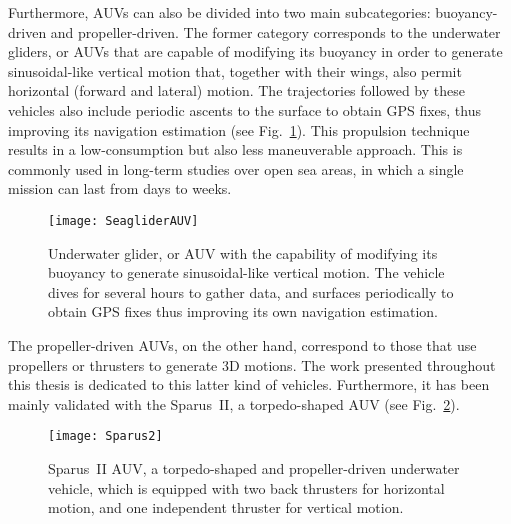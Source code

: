 Furthermore, \acp{AUV} can also be divided into two main subcategories:
buoyancy-driven and propeller-driven. The former category corresponds to the
underwater gliders, or \acp{AUV} that are capable of modifying its buoyancy in
order to generate sinusoidal-like vertical motion that, together with their
wings, also permit horizontal (forward and lateral) motion. The trajectories
followed by these vehicles also include periodic ascents to the surface to
obtain GPS fixes, thus improving its navigation estimation (see
Fig.~\ref{fig:GliderAUV}). This propulsion technique results in a
low-consumption but also less maneuverable approach. This is commonly used in
long-term studies over open sea areas, in which a single mission can last from
days to weeks.

\begin{figure}[htbp]
	\centering
	\texttt{[image: SeagliderAUV]} \quad
\caption[Underwater glider and its sinusoidal-like vertical motion.]
{Underwater glider, or AUV with the capability of modifying its buoyancy to
generate sinusoidal-like vertical motion. The vehicle dives for several hours to
gather data, and surfaces periodically to obtain GPS fixes thus improving its
own navigation estimation.}
\label{fig:GliderAUV}
\end{figure}

The propeller-driven \acp{AUV}, on the other hand, correspond to those that use
propellers or thrusters to generate \ac{3D} motions. The work presented
throughout this thesis is dedicated to this latter kind of vehicles.
Furthermore, it has been mainly validated with the Sparus~II, a torpedo-shaped
\ac{AUV} (see Fig.~\ref{fig:Sparus2}).

\begin{figure}[htbp]
	\centering
	\texttt{[image: Sparus2]} \quad
\caption[Sparus~II: a torpedo-shaped and propeller-driven autonomous underwater
vehicle (AUV).]
{Sparus~II AUV, a torpedo-shaped and propeller-driven underwater vehicle, which
is equipped with two back thrusters for horizontal motion, and one independent
thruster for vertical motion.}
\label{fig:Sparus2}
\end{figure}


